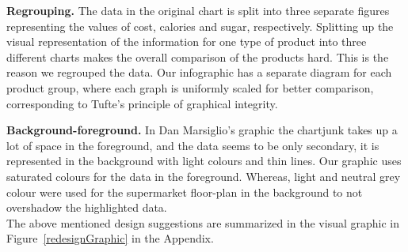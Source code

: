 \textbf{Regrouping.} The data in the original chart is split into three separate
figures representing the values of cost, calories and sugar, respectively.
Splitting up the visual representation of the information for one type of
product into three different charts makes the overall comparison of the products
hard. This is the reason we regrouped the data. Our infographic has a separate
diagram for each product group, where each graph is uniformly scaled for better
comparison, corresponding to Tufte's principle of graphical integrity.

\textbf{Background-foreground.} In Dan Marsiglio's graphic the chartjunk takes
up a lot of space in the foreground, and the data seems to be only secondary, it
is represented in the background with light colours and thin lines. Our graphic
uses saturated colours for the data in the foreground. Whereas, light and neutral
grey colour were used for the supermarket floor-plan in the background to not
overshadow the highlighted data.\\

The above mentioned design suggestions are summarized in the visual graphic in
Figure~\ref{redesignGraphic} in the Appendix.
